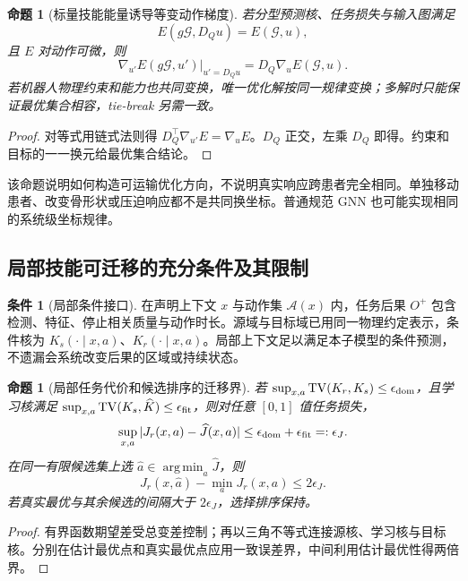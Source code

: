 \documentclass[UTF8,fontset=fandol,11pt,a4paper]{ctexart}
\theoremstyle{plain}
\newtheorem{proposition}[theorem]{命题}
\theoremstyle{definition}
\newtheorem{assumption}[theorem]{条件}
\theoremstyle{remark}
\numberwithin{equation}{section}
\newcommand{\G}{\mathcal G}
\newcommand{\cA}{\mathcal A}
\DeclareMathOperator{\TV}{TV}
\DeclareMathOperator*{\argmin}{arg\,min}
\begin{document}
\begin{proposition}[标量技能能量诱导等变动作梯度]
若分型预测核、任务损失与输入图满足
\begin{equation}
E(g\G,D_Qu)=E(\G,u),
\end{equation}
且 $E$ 对动作可微，则
\begin{equation}
\nabla_{u'}E(g\G,u')\big|_{u'=D_Qu}
=D_Q\nabla_uE(\G,u).
\label{eq:gradequiv}
\end{equation}
若机器人物理约束和能力也共同变换，唯一优化解按同一规律变换；多解时只能保证最优集合相容，tie-break 另需一致。
\end{proposition}
\begin{proof}
对等式用链式法则得 $D_Q^\top\nabla_{u'}E=\nabla_uE$。$D_Q$ 正交，左乘 $D_Q$ 即得。约束和目标的一一换元给最优集合结论。
\end{proof}

该命题说明如何构造可运输优化方向，不说明真实响应跨患者完全相同。单独移动患者、改变骨形状或压迫响应都不是共同换坐标。普通规范 GNN 也可能实现相同的系统级坐标规律。

\subsection{局部技能可迁移的充分条件及其限制}
\begin{assumption}[局部条件接口]
在声明上下文 $x$ 与动作集 $\cA(x)$ 内，任务后果 $O^+$ 包含检测、特征、停止相关质量与动作时长。源域与目标域已用同一物理约定表示，条件核为 $K_s(\cdot\mid x,a)$、$K_r(\cdot\mid x,a)$。局部上下文足以满足本子模型的条件预测，不遗漏会系统改变后果的区域或持续状态。
\end{assumption}
\begin{proposition}[局部任务代价和候选排序的迁移界]
若 $\sup_{x,a}\TV(K_r,K_s)\le\epsilon_{\rm dom}$，且学习核满足 $\sup_{x,a}\TV(K_s,\widehat K)\le\epsilon_{\rm fit}$，则对任意 $[0,1]$ 值任务损失，
\begin{equation}
\sup_{x,a}|J_r(x,a)-\widehat J(x,a)|\le
\epsilon_{\rm dom}+\epsilon_{\rm fit}=:\epsilon_J.
\end{equation}
在同一有限候选集上选 $\hat a\in\argmin_a\widehat J$，则
\begin{equation}
J_r(x,\hat a)-\min_aJ_r(x,a)\le2\epsilon_J.
\label{eq:regret}
\end{equation}
若真实最优与其余候选的间隔大于 $2\epsilon_J$，选择排序保持。
\end{proposition}
\begin{proof}
有界函数期望差受总变差控制；再以三角不等式连接源核、学习核与目标核。分别在估计最优点和真实最优点应用一致误差界，中间利用估计最优性得两倍界。
\end{proof}
\end{document}
